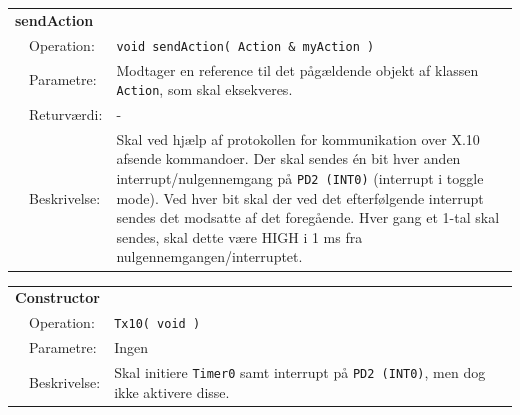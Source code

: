 \begin{table}[h]
\begin{tabularx}{\textwidth}{p{0.6 cm} l X} %
\multicolumn{3}{l}{\textbf{sendAction}}\\
& Operation: & %
\texttt{void sendAction( Action \& myAction )} 
\\ & Parametre: & %
Modtager en reference til det pågældende objekt af klassen \texttt{Action}, som skal eksekveres.
\\ & Returværdi: & %
-
\\ & Beskrivelse: & %
Skal ved hjælp af protokollen for kommunikation over X.10 afsende kommandoer. Der skal sendes én bit hver anden interrupt/nulgennemgang på \texttt{PD2 (INT0)} (interrupt i toggle mode). Ved hver bit skal der ved det efterfølgende interrupt sendes det modsatte af det foregående. Hver gang et 1-tal skal sendes, skal dette være HIGH i 1 ms fra nulgennemgangen/interruptet.
\\ \end{tabularx}
\end{table}

\clearpage

\begin{table}[h]
\begin{tabularx}{\textwidth}{p{0.6 cm} l X} %
\multicolumn{3}{l}{\textbf{Constructor}}\\
& Operation: & %
\texttt{Tx10( void ) }
\\ & Parametre: & %
Ingen
\\ & Beskrivelse: & %
Skal initiere \texttt{Timer0} samt interrupt på \texttt{PD2 (INT0)}, men dog ikke aktivere disse.
\\ \end{tabularx}
\end{table}

